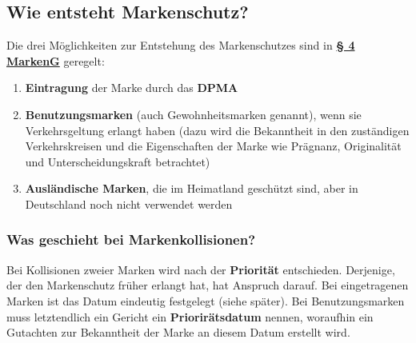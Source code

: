 \documentclass[12pt,A4]{extarticle}
\newcommand{\highlight}[1]{\textcolor{highlightColor}{\textbf{#1}}}
\newcommand{\markenG}[2][]{\textbf{\textcolor{markenGesetzLink}{\href{https://www.gesetze-im-internet.de/markeng/__#2.html}{§ #2 \ifthenelse{\equal{#1}{}}{}{#1 }MarkenG}}}}
\begin{document}
\subsection{Wie entsteht Markenschutz?}
Die drei Möglichkeiten zur Entstehung des Markenschutzes sind in \markenG{4} geregelt:
\begin{enumerate}
  \item{\highlight{Eintragung} der Marke durch das \textbf{DPMA}}
  \item{\highlight{Benutzungsmarken} (auch Gewohnheitsmarken genannt), wenn sie Verkehrsgeltung erlangt haben (dazu wird die Bekanntheit in den zuständigen Verkehrskreisen und die Eigenschaften der Marke wie Prägnanz, Originalität und Unterscheidungskraft betrachtet)}
  \item{\textbf{Ausländische Marken}, die im Heimatland geschützt sind, aber in Deutschland noch nicht verwendet werden}
\end{enumerate}

\subsubsection{Was geschieht bei Markenkollisionen?}
Bei Kollisionen zweier Marken wird nach der \highlight{Priorität} entschieden. Derjenige, der den Markenschutz früher erlangt hat, hat Anspruch darauf.
Bei eingetragenen Marken ist das Datum eindeutig festgelegt (siehe später).
Bei Benutzungsmarken muss letztendlich ein Gericht ein \textbf{Priorirätsdatum} nennen, woraufhin ein Gutachten zur Bekanntheit der Marke an diesem Datum erstellt wird.
\end{document}
